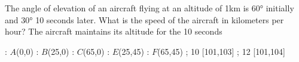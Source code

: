
%
%
%
%
% 
% 

\question The angle of elevation of an aircraft flying at an altitude of 1km 
is $\ang{60}$ initially and $\ang{30}$ 10 seconds later. What is the speed of the
aircraft in kilometers per hour? The aircraft maintains its altitude for the 10 seconds

\insertQR{}

\ifprintanswers
  \begin{marginfigure}
      : $A$(0,0)
      : $B$(25,0)
      : $C$(65,0)
      : $E$(25,45)
      : $F$(65,45)
    \figdrawbegin{}
      \figdrawline [100,101,102,104,103,100]
      \figdrawline [100,103]
      \figdrawline [100,104]
      \figdrawline [103,101]
       ; 10 [101,103] 
       ; 12 [101,104] 
    \figdrawend
    \centerline{\box\figBoxA}
  \end{marginfigure}
\fi 

